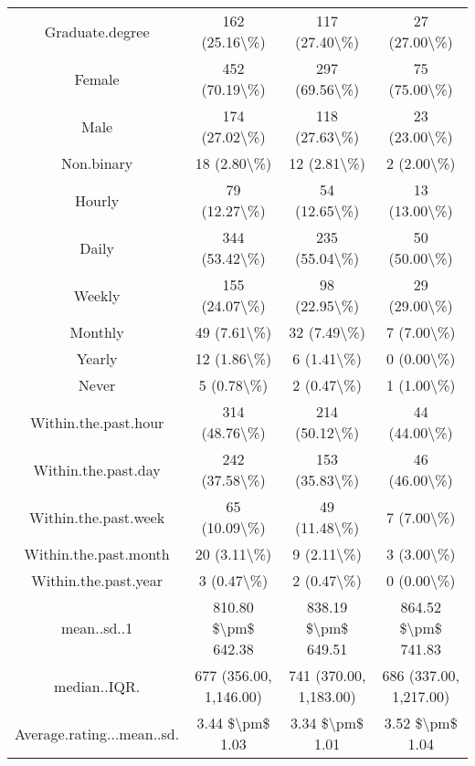 \begin{table}[!htbp]
\begin{tabular}{@{\extracolsep{5pt}} cccc}
Graduate.degree & 162 (25.16\textbackslash \%) & 117 (27.40\textbackslash \%) & 27 (27.00\textbackslash \%) \\ 
Female & 452 (70.19\textbackslash \%) & 297 (69.56\textbackslash \%) & 75 (75.00\textbackslash \%) \\ 
Male & 174 (27.02\textbackslash \%) & 118 (27.63\textbackslash \%) & 23 (23.00\textbackslash \%) \\ 
Non.binary & 18 (2.80\textbackslash \%) & 12 (2.81\textbackslash \%) & 2 (2.00\textbackslash \%) \\ 
Hourly & 79 (12.27\textbackslash \%) & 54 (12.65\textbackslash \%) & 13 (13.00\textbackslash \%) \\ 
Daily & 344 (53.42\textbackslash \%) & 235 (55.04\textbackslash \%) & 50 (50.00\textbackslash \%) \\ 
Weekly & 155 (24.07\textbackslash \%) & 98 (22.95\textbackslash \%) & 29 (29.00\textbackslash \%) \\ 
Monthly & 49 (7.61\textbackslash \%) & 32 (7.49\textbackslash \%) & 7 (7.00\textbackslash \%) \\ 
Yearly & 12 (1.86\textbackslash \%) & 6 (1.41\textbackslash \%) & 0 (0.00\textbackslash \%) \\ 
Never & 5 (0.78\textbackslash \%) & 2 (0.47\textbackslash \%) & 1 (1.00\textbackslash \%) \\ 
Within.the.past.hour & 314 (48.76\textbackslash \%) & 214 (50.12\textbackslash \%) & 44 (44.00\textbackslash \%) \\ 
Within.the.past.day & 242 (37.58\textbackslash \%) & 153 (35.83\textbackslash \%) & 46 (46.00\textbackslash \%) \\ 
Within.the.past.week & 65 (10.09\textbackslash \%) & 49 (11.48\textbackslash \%) & 7 (7.00\textbackslash \%) \\ 
Within.the.past.month & 20 (3.11\textbackslash \%) & 9 (2.11\textbackslash \%) & 3 (3.00\textbackslash \%) \\ 
Within.the.past.year & 3 (0.47\textbackslash \%) & 2 (0.47\textbackslash \%) & 0 (0.00\textbackslash \%) \\ 
mean..sd..1 & 810.80 \$\textbackslash pm\$ 642.38 & 838.19 \$\textbackslash pm\$ 649.51 & 864.52 \$\textbackslash pm\$ 741.83 \\ 
median..IQR. & 677 (356.00, 1,146.00) & 741 (370.00, 1,183.00) & 686 (337.00, 1,217.00) \\ 
Average.rating...mean..sd. & 3.44 \$\textbackslash pm\$ 1.03 & 3.34 \$\textbackslash pm\$ 1.01 & 3.52 \$\textbackslash pm\$ 1.04 \\ 

\end{tabular}
\end{table}
